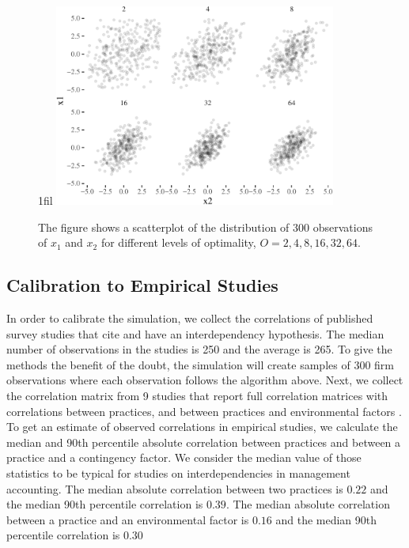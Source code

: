 \documentclass[12pt]{article}
\makeatletter
\newcommand*{\centerfloat}{%
  \parindent \z@
  \leftskip \z@ \@plus 1fil \@minus \textwidth
  \rightskip\leftskip
  \parfillskip \z@skip}
\makeatother
\begin{document}
\begin{figure}
\centerfloat
\includegraphics[width=350px]{figure-latex/scatter-1.pdf}
\caption[Scatterplot of simulated practices]{\label{scatter} The figure shows a scatterplot of the distribution of $300$ observations of $x_1$ and $x_2$ for different levels of optimality, $O = 2, 4, 8, 16, 32, 64$.} 
\end{figure}

\subsection{Calibration to Empirical Studies}\label{calibration-to-empirical-studies}

In order to calibrate the simulation, we collect the correlations of published survey studies that cite \citet{grabner_management_2013} and have an interdependency hypothesis. The median number of observations in the studies is 250 and the average is 265. To give the methods the benefit of the doubt, the simulation will create samples of 300 firm observations where each observation follows the algorithm above. Next, we collect the correlation matrix from 9 studies that report full correlation matrices with correlations between practices, and between practices and environmental factors \citep{dekker_collaborative_2016, grabner_incentive_2014, grabner_cost_2016, bedford_configurations_2015, heinicke_examination_2016, bedford_performance_2019, abernethy_are_2015, sponem_exploring_2016, samagaio_management_2018}. To get an estimate of observed correlations in empirical studies, we calculate the median and 90th percentile absolute correlation between practices and between a practice and a contingency factor. We consider the median value of those statistics to be typical for studies on interdependencies in management accounting. The median absolute correlation between two practices is $0.22$ and the median 90th percentile correlation is $0.39$. The median absolute correlation between a practice and an environmental factor is $0.16$ and the median 90th percentile correlation is $0.30$
\end{document}
